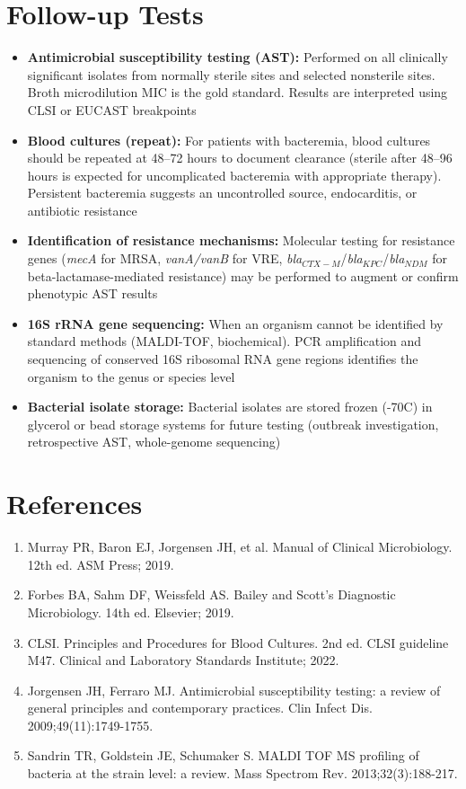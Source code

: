 \section*{Follow-up Tests}
\begin{itemize}
  \item \textbf{Antimicrobial susceptibility testing (AST):} Performed on all clinically significant isolates from normally sterile sites and selected nonsterile sites. Broth microdilution MIC is the gold standard. Results are interpreted using CLSI or EUCAST breakpoints
  \item \textbf{Blood cultures (repeat):} For patients with bacteremia, blood cultures should be repeated at 48--72 hours to document clearance (sterile after 48--96 hours is expected for uncomplicated bacteremia with appropriate therapy). Persistent bacteremia suggests an uncontrolled source, endocarditis, or antibiotic resistance
  \item \textbf{Identification of resistance mechanisms:} Molecular testing for resistance genes (\textit{mecA} for MRSA, \textit{vanA/vanB} for VRE, \textit{bla}$_{CTX-M}$/\textit{bla}$_{KPC}$/\textit{bla}$_{NDM}$ for beta-lactamase-mediated resistance) may be performed to augment or confirm phenotypic AST results
  \item \textbf{16S rRNA gene sequencing:} When an organism cannot be identified by standard methods (MALDI-TOF, biochemical). PCR amplification and sequencing of conserved 16S ribosomal RNA gene regions identifies the organism to the genus or species level
  \item \textbf{Bacterial isolate storage:} Bacterial isolates are stored frozen (-70\textdegree{}C) in glycerol or bead storage systems for future testing (outbreak investigation, retrospective AST, whole-genome sequencing)
\end{itemize}

\section*{References}
\begin{enumerate}
  \item Murray PR, Baron EJ, Jorgensen JH, et al. Manual of Clinical Microbiology. 12th ed. ASM Press; 2019.
  \item Forbes BA, Sahm DF, Weissfeld AS. Bailey and Scott's Diagnostic Microbiology. 14th ed. Elsevier; 2019.
  \item CLSI. Principles and Procedures for Blood Cultures. 2nd ed. CLSI guideline M47. Clinical and Laboratory Standards Institute; 2022.
  \item Jorgensen JH, Ferraro MJ. Antimicrobial susceptibility testing: a review of general principles and contemporary practices. Clin Infect Dis. 2009;49(11):1749-1755.
  \item Sandrin TR, Goldstein JE, Schumaker S. MALDI TOF MS profiling of bacteria at the strain level: a review. Mass Spectrom Rev. 2013;32(3):188-217.
\end{enumerate}

\clearpage
